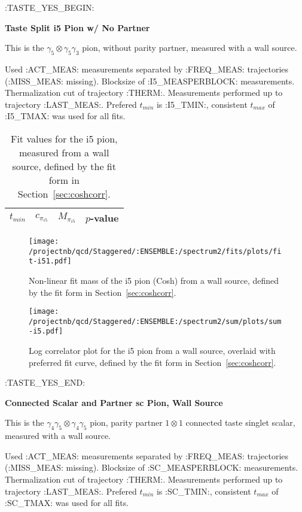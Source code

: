 \clearpage

:TASTE_YES_BEGIN:
\centerline{\textbf{Taste Split i5 Pion w/ No Partner}}

This is the $\gamma_5 \otimes \gamma_5 \gamma_3$ pion, without parity partner, measured with a wall source. 

{\small{Used :ACT_MEAS: measurements separated by :FREQ_MEAS: trajectories (:MISS_MEAS: missing). Blocksize of :I5_MEASPERBLOCK: measurements. Thermalization cut of trajectory :THERM:. Measurements performed up to trajectory :LAST_MEAS:. Prefered $t_{min}$ is :I5_TMIN:, consistent $t_{max}$ of :I5_TMAX: was used for all fits.}}

\begin{table}[ht!]
\centering
\scriptsize
\begin{tabular}{|c|c|c|c|}
\hline
 $t_{min}$ & $c_{\pi_{i5}}$ &  $M_{\pi_{i5}}$ & $p$-value \\
\hline

\end{tabular}
\caption{Fit values for the i5 pion, measured from a wall source, defined by the fit form in Section~\ref{sec:coshcorr}.}
\end{table}


\begin{figure}[H]
\centering
\texttt{[image: /projectnb/qcd/Staggered/:ENSEMBLE:/spectrum2/fits/plots/fit-i51.pdf]}
\caption{Non-linear fit mass of the i5 pion (Cosh) from a wall source, defined by the fit form in Section~\ref{sec:coshcorr}.}
\end{figure}

\begin{figure}[H]
\centering
\texttt{[image: /projectnb/qcd/Staggered/:ENSEMBLE:/spectrum2/sum/plots/sum-i5.pdf]}
\caption{Log correlator plot for the i5 pion from a wall source, overlaid with preferred fit curve, defined by the fit form in Section~\ref{sec:coshcorr}.}
\end{figure}

\clearpage
:TASTE_YES_END:

\centerline{\textbf{Connected Scalar and Partner sc Pion, Wall Source}}

This is the $\gamma_4 \gamma_5 \otimes \gamma_4 \gamma_5$ pion, parity partner $1 \otimes 1$ connected taste singlet scalar, measured with a wall source. 

{\small{Used :ACT_MEAS: measurements separated by :FREQ_MEAS: trajectories (:MISS_MEAS: missing). Blocksize of :SC_MEASPERBLOCK: measurements. Thermalization cut of trajectory :THERM:. Measurements performed up to trajectory :LAST_MEAS:. Prefered $t_{min}$ is :SC_TMIN:, consistent $t_{max}$ of :SC_TMAX: was used for all fits.}}

